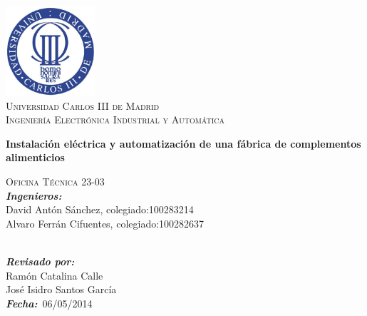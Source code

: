 \begin{titlepage}

\begin{center}


\includegraphics[width=0.25\textwidth]{./uc3m.jpg}\\[2cm]    
\textsc{\huge Universidad Carlos III de Madrid}\\[0.5cm]
\textsc{\LARGE Ingeniería Electrónica Industrial y Automática}\\[0.5cm]
\vspace{4cm}

{\LARGE \bfseries{Instalación eléctrica y automatización de una fábrica de complementos alimenticios}\\[4.5cm]}


\end{center}
\setlength{\parindent}{0cm}


\vspace{10pt}
\textsc{\Large Oficina Técnica 23-03}\\

\emph{\bfseries{Ingenieros:}}\\
David Antón Sánchez, colegiado:100283214\\
Alvaro Ferrán Cifuentes, colegiado:100282637\\\




\emph{\bfseries{Revisado por:}}\\
Ramón Catalina Calle\\
José Isidro Santos García\\


\emph{\bfseries{Fecha:}}\ 06/05/2014\\












\end{titlepage}\begin{titlepage}


\end{titlepage}
